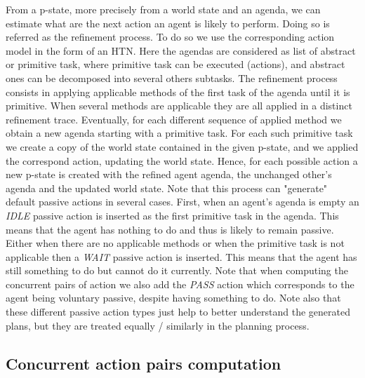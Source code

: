 From a p-state, more precisely from a world state and an agenda, we can estimate what are the next action an agent is likely to perform. Doing so is referred as the refinement process. To do so we use the corresponding action model in the form of an HTN. Here the agendas are considered as list of abstract or primitive task, where primitive task can be executed (actions), and abstract ones can be decomposed into several others subtasks. 
The refinement process consists in applying applicable methods of the first task of the agenda until it is primitive. When several methods are applicable they are all applied in a distinct refinement trace.
Eventually, for each different sequence of applied method we obtain a new agenda starting with a primitive task. For each such primitive task we create a copy of the world state contained in the given p-state, and we applied the correspond action, updating the world state. 
Hence, for each possible action a new p-state is created with the refined agent agenda, the unchanged other's agenda and the updated world state. 
Note that this process can "generate" default passive actions in several cases. First, when an agent's agenda is empty an \textit{IDLE} passive action is inserted as the first primitive task in the agenda. This means that the agent has nothing to do and thus is likely to remain passive. Either when there are no applicable methods or when the primitive task is not applicable then a \textit{WAIT} passive action is inserted. This means that the agent has still something to do but cannot do it currently. Note that when computing the concurrent pairs of action we also add the \textit{PASS} action which corresponds to the agent being voluntary passive, despite having something to do. Note also that these different passive action types just help to better understand the generated plans, but they are treated equally / similarly in the planning process.

    \subsection{Concurrent action pairs computation}

